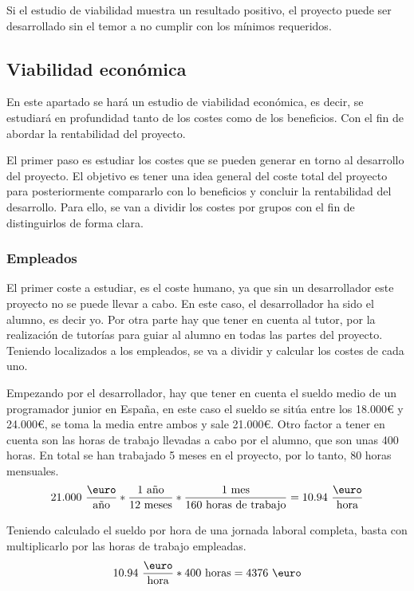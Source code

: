 Si el estudio de viabilidad muestra un resultado positivo, el proyecto puede ser desarrollado sin el temor a no cumplir con los mínimos requeridos.

\subsection{Viabilidad económica}
En este apartado se hará un estudio de viabilidad económica, es decir, se estudiará en profundidad tanto de los costes como de los beneficios. Con el fin de abordar la rentabilidad del proyecto.

El primer paso es estudiar los costes que se pueden generar en torno al desarrollo del proyecto. El objetivo es tener una idea general del coste total del proyecto para posteriormente compararlo con lo beneficios y concluir la rentabilidad del desarrollo. Para ello, se van a dividir los costes por grupos con el fin de distinguirlos de forma clara.

\subsubsection{Empleados}
El primer coste a estudiar, es el coste humano, ya que sin un desarrollador este proyecto no se puede llevar a cabo. En este caso, el desarrollador ha sido el alumno, es decir yo. Por otra parte hay que tener en cuenta al tutor, por la realización de tutorías para guiar al alumno en todas las partes del proyecto. Teniendo localizados a los empleados, se va a dividir y calcular los costes de cada uno.

Empezando por el desarrollador, hay que tener en cuenta el sueldo medio de un programador junior en España, en este caso el sueldo se sitúa entre los 18.000€ y 24.000€, se toma la media entre ambos y sale 21.000€. Otro factor a tener en cuenta son las horas de trabajo llevadas a cabo por el alumno, que son unas 400 horas. En total se han trabajado 5 meses en el proyecto, por lo tanto, 80 horas mensuales.
\begin{equation}
    21.000\ \frac{\text{\euro}}{\text{año}}*\frac{1\ \text{año}}{12\ \text{meses}}*\frac{1\ \text{mes}}{160\ \text{horas de trabajo}} = 10.94\ \frac{\text{\euro}}{\text{hora}}
\end{equation}

Teniendo calculado el sueldo por hora de una jornada laboral completa, basta con multiplicarlo por las horas de trabajo empleadas.
\begin{equation}
    10.94\ \frac{\text{\euro}}{\text{hora}}*400\ \text{horas} = 4376\ \text{\euro}
\end{equation}

